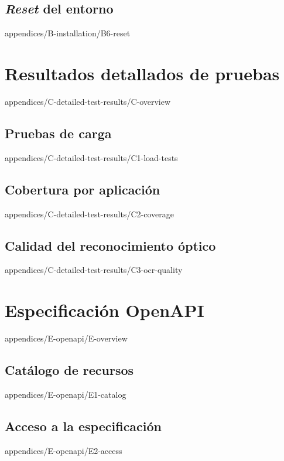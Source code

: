 \documentclass[epsbased,tfg,covers,final,printable,extendedindex,%
               firstnumbered,lof,lot, loc]{tfgtfmthesisuam}
\begin{document}
  \section{\textit{Reset} del entorno\label{SEC:INSTALL-RESET}}%
          {appendices/B-installation/B6-reset}

\chapter{Resultados detallados de pruebas\label{AP:TEST-RESULTS}}%
        {appendices/C-detailed-test-results/C-overview}
  \section{Pruebas de carga\label{SEC:CDETAIL-LOAD}}%
          {appendices/C-detailed-test-results/C1-load-tests}
  \section[Cobertura por aplicación]%
          {Cobertura por aplicación\label{SEC:CDETAIL-COVERAGE}}%
          {appendices/C-detailed-test-results/C2-coverage}
  \section[Calidad del reconocimiento óptico]%
          {Calidad del reconocimiento óptico\label{SEC:CDETAIL-OCR}}%
          {appendices/C-detailed-test-results/C3-ocr-quality}


\chapter{Especificación OpenAPI\label{AP:OPENAPI}}%
        {appendices/E-openapi/E-overview}
  \section{Catálogo de recursos\label{SEC:OPENAPI-CATALOG}}%
          {appendices/E-openapi/E1-catalog}
  \section{Acceso a la especificación\label{SEC:OPENAPI-ACCESS}}%
          {appendices/E-openapi/E2-access}
\end{document}
